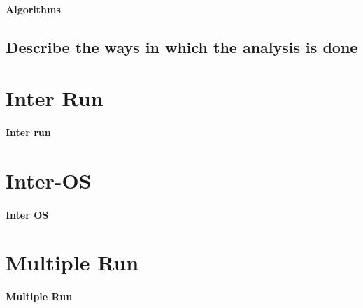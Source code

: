 \paragraph{Algorithms}
\subsection{Describe the ways in which the analysis is done}

\section{Inter Run}
\paragraph{Inter run}

\section{Inter-OS}
\paragraph{Inter OS}

\section{Multiple Run}
\paragraph{Multiple Run}

